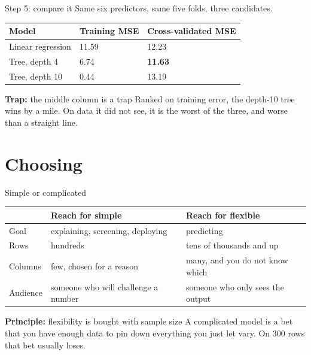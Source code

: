 \documentclass[aspectratio=169]{beamer}
\newenvironment{principle}[1]{\begin{block}{\textbf{Principle:} #1}}{\end{block}}
\newenvironment{trap}[1]{\begin{alertblock}{\textbf{Trap:} #1}}{\end{alertblock}}
\begin{document}
\begin{frame}{Step 5: compare it}
Same six predictors, same five folds, three candidates.
\begin{center}\small
\begin{tabular}{L{0.28\textwidth} L{0.22\textwidth} L{0.22\textwidth}}
\toprule
\textbf{Model} & \textbf{Training MSE} & \textbf{Cross-validated MSE} \\
\midrule
Linear regression & 11.59 & 12.23 \\
Tree, depth 4     & \phantom{0}6.74 & \textbf{11.63} \\
Tree, depth 10    & \phantom{0}0.44 & 13.19 \\
\bottomrule
\end{tabular}
\end{center}
\begin{trap}{the middle column is a trap}
Ranked on training error, the depth-10 tree wins by a mile. On data it did not see, it is the
worst of the three, and worse than a straight line.
\end{trap}
\end{frame}

\section{Choosing}
\begin{frame}{Simple or complicated}
\begin{center}\small
\begin{tabular}{L{0.16\textwidth} L{0.34\textwidth} L{0.36\textwidth}}
\toprule
 & \textbf{Reach for simple} & \textbf{Reach for flexible} \\
\midrule
Goal      & explaining, screening, deploying & predicting \\
Rows      & hundreds & tens of thousands and up \\
Columns   & few, chosen for a reason & many, and you do not know which \\
Audience  & someone who will challenge a number & someone who only sees the output \\
\bottomrule
\end{tabular}
\end{center}
\begin{principle}{flexibility is bought with sample size}
A complicated model is a bet that you have enough data to pin down everything you just let vary.
On 300 rows that bet usually loses.
\end{principle}
\end{frame}
\end{document}
